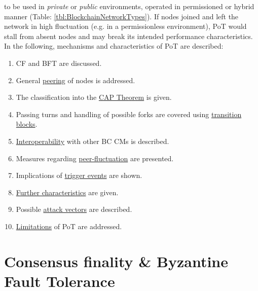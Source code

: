 to be used in \textit{private} or \textit{public} environments,
operated in permissioned or hybrid manner (Table: \ref{tbl:BlockchainNetworkTypes}).
If nodes joined and left the network in high fluctuation (e.g. in a permissionless environment),
\gls{PoT} would stall from absent nodes and may break its intended performance characteristics. \\
In the following, mechanisms and characteristics of \gls{PoT} are described:
\begin{enumerate}
	\item \gls{CF} and \gls{BFT} are discussed.
	\item General \hyperref[sec:Peering]{peering} of nodes is addressed.
	\item The classification into the \hyperref[sec:CAPtheorem]{CAP Theorem} is given.
	\item Passing turns and handling of possible forks are covered using \hyperref[sec:TransitionBlocks]{transition blocks}.
	\item \hyperref[sec:Interoperability]{Interoperability} with other \gls{BC} \gls{CM}s is described.
	\item Measures regarding \hyperref[sec:PeerFluctuation]{peer-fluctuation} are presented.
	\item Implications of \hyperref[sec:ClaimsAndTriggers]{trigger events} are shown.
	\item \hyperref[sec:FurtherCharacteristics]{Further characteristics} are given.
	\item Possible \hyperref[sec:AttackVectors]{attack vectors} are described.
	\item \hyperref[sec:Limitations]{Limitations} of \gls{PoT} are addressed.
\end{enumerate}



\FloatBarrier

\section{Consensus finality \& Byzantine Fault Tolerance}
\label{sec:CFandBFT}

